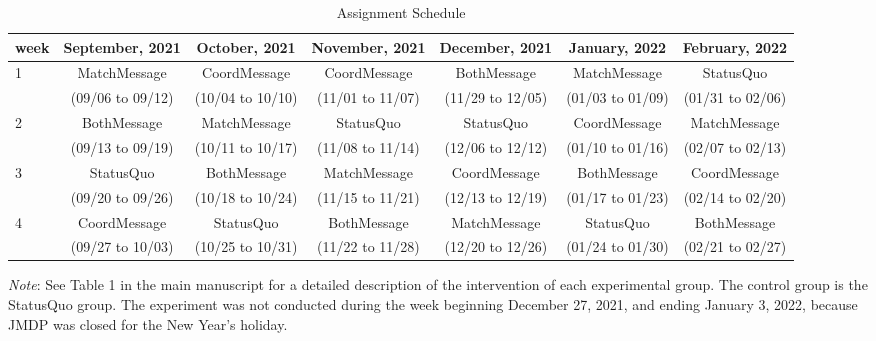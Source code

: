 \documentclass[12pt, a4paper]{article}
\begin{document}
\begin{table}[H]

\caption{\label{tab:assignment}Assignment Schedule}
\centering
\fontsize{8}{10}\selectfont
\begin{threeparttable}
\begin{tabular}[t]{lcccccc}
\toprule
week & September, 2021 & October, 2021 & November, 2021 & December, 2021 & January, 2022 & February, 2022\\
\midrule
1 & MatchMessage & CoordMessage & CoordMessage & BothMessage & MatchMessage & StatusQuo\\
 & (09/06 to 09/12) & (10/04 to 10/10) & (11/01 to 11/07) & (11/29 to 12/05) & (01/03 to 01/09) & (01/31 to 02/06)\\
2 & BothMessage & MatchMessage & StatusQuo & StatusQuo & CoordMessage & MatchMessage\\
 & (09/13 to 09/19) & (10/11 to 10/17) & (11/08 to 11/14) & (12/06 to 12/12) & (01/10 to 01/16) & (02/07 to 02/13)\\
3 & StatusQuo & BothMessage & MatchMessage & CoordMessage & BothMessage & CoordMessage\\
 & (09/20 to 09/26) & (10/18 to 10/24) & (11/15 to 11/21) & (12/13 to 12/19) & (01/17 to 01/23) & (02/14 to 02/20)\\
4 & CoordMessage & StatusQuo & BothMessage & MatchMessage & StatusQuo & BothMessage\\
 & (09/27 to 10/03) & (10/25 to 10/31) & (11/22 to 11/28) & (12/20 to 12/26) & (01/24 to 01/30) & (02/21 to 02/27)\\
\bottomrule
\end{tabular}
\begin{tablenotes}
\item \emph{Note}: See Table 1 in the main manuscript for a detailed description of the intervention of each experimental group. The control group is the StatusQuo group. The experiment was not conducted during the week beginning December 27, 2021, and ending January 3, 2022, because JMDP was closed for the New Year's holiday.
\end{tablenotes}
\end{threeparttable}
\end{table}
\end{document}
